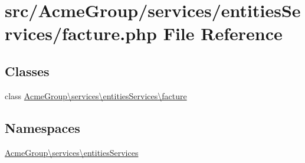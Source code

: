 \hypertarget{services_2entities_services_2facture_8php}{\section{src/\+Acme\+Group/services/entities\+Services/facture.php File Reference}
\label{services_2entities_services_2facture_8php}
}
\subsection*{Classes}
\begin{DoxyCompactItemize}
\item 
class \hyperlink{class_acme_group_1_1services_1_1entities_services_1_1facture}{Acme\+Group\textbackslash{}services\textbackslash{}entities\+Services\textbackslash{}facture}
\end{DoxyCompactItemize}
\subsection*{Namespaces}
\begin{DoxyCompactItemize}
\item 
 \hyperlink{namespace_acme_group_1_1services_1_1entities_services}{Acme\+Group\textbackslash{}services\textbackslash{}entities\+Services}
\end{DoxyCompactItemize}
